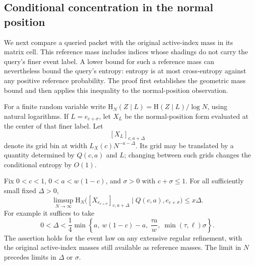 \subsection{Conditional concentration in the normal position}

We next compare a queried packet with the original active-index mass
in its matrix cell. This reference mass includes indices whose shadings
do not carry the query's finer event label. A lower bound for such a
reference mass can nevertheless bound the query's entropy: entropy is
at most cross-entropy against any positive reference probability. The
proof first establishes the geometric mass bound and then applies this
inequality to the normal-position observation.

For a finite random variable write
$\mathrm H_N(Z\mid L)=\mathrm H(Z\mid L)/\log N$, using natural
logarithms. If $L=e_{c+\sigma}$, let $X_L$ be the normal-position
form evaluated at the center of that finer label. Let
\[
 [X_L]_{c,a+\Delta}
\]
denote its grid bin at width $L_X(c)N^{-a-\Delta}$. Its grid may be
translated by a quantity determined by $Q(c,a)$ and $L$; changing
between such grids changes the conditional entropy by $O(1)$.

\begin{lemma}
\label{lem:conditional-X}
Fix $0<c<1$, $0<a<w(1-c)$, and $\sigma>0$ with
$c+\sigma\le1$. For all sufficiently small fixed $\Delta>0$,
\begin{equation}
 \limsup_{N\to\infty}
 \mathrm H_N\bigl([X_{e_{c+\sigma}}]_{c,a+\Delta}
                  \mid Q(c,a),e_{c+\sigma}\bigr)
 \le x\Delta.
\label{eq:conditional-X-bound}
\end{equation}
For example it suffices to take
\begin{equation}
 0<\Delta<\frac14\min\left\{
 a,\ w(1-c)-a,\ \frac{\tau a}{w},\
 \min(\tau,\ell)\sigma
 \right\}.
\label{eq:conditional-X-admissible}
\end{equation}
The assertion holds for the event law on any extensive regular
refinement, with the original active-index masses still available as
reference masses. The limit in $N$ precedes limits in $\Delta$ or
$\sigma$.
\end{lemma}

